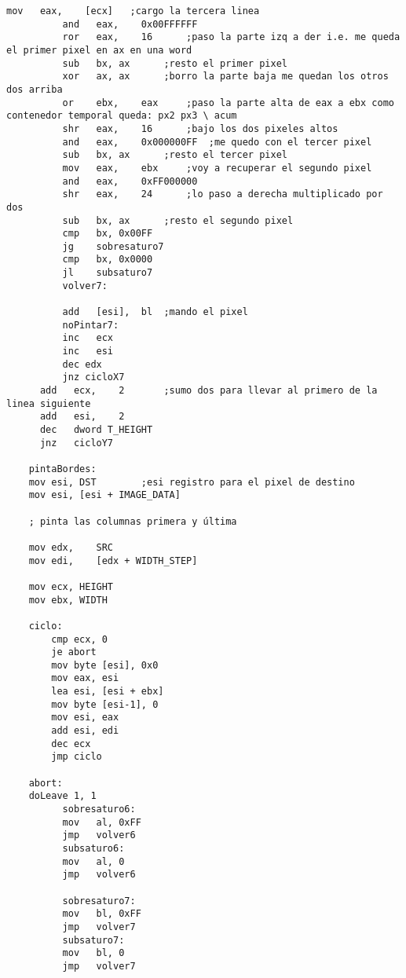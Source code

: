 \documentclass[11pt]{article}
\begin{document}
\begin{lstlisting}[frame=single]
	      mov	eax,	[ecx]	;cargo la tercera linea
	      and	eax,	0x00FFFFFF
	      ror	eax,	16		;paso la parte izq a der i.e. me queda el primer pixel en ax en una word
	      sub	bx,	ax		;resto el primer pixel
	      xor	ax,	ax		;borro la parte baja me quedan los otros dos arriba
	      or	ebx,	eax		;paso la parte alta de eax a ebx como contenedor temporal queda: px2 px3 \ acum
	      shr	eax,	16		;bajo los dos pixeles altos
	      and	eax,	0x000000FF	;me quedo con el tercer pixel
	      sub	bx,	ax		;resto el tercer pixel
	      mov	eax,	ebx		;voy a recuperar el segundo pixel
	      and	eax,	0xFF000000
	      shr	eax,	24		;lo paso a derecha multiplicado por dos
	      sub	bx,	ax		;resto el segundo pixel
	      cmp	bx,	0x00FF
	      jg	sobresaturo7
	      cmp	bx,	0x0000
	      jl	subsaturo7
	      volver7:

	      add	[esi],	bl	;mando el pixel
	      noPintar7:
	      inc	ecx
	      inc	esi
	      dec edx
	      jnz cicloX7
	  add	ecx,	2		;sumo dos para llevar al primero de la linea siguiente
	  add	esi,	2
	  dec	dword T_HEIGHT
	  jnz	cicloY7
	  
	pintaBordes:
	mov esi, DST		;esi registro para el pixel de destino
	mov esi, [esi + IMAGE_DATA]

	; pinta las columnas primera y última

	mov	edx,	SRC
	mov	edi,	[edx + WIDTH_STEP]

	mov ecx, HEIGHT
	mov ebx, WIDTH
	
	ciclo:
		cmp ecx, 0
		je abort
		mov byte [esi], 0x0
		mov eax, esi
		lea esi, [esi + ebx]
		mov byte [esi-1], 0
		mov esi, eax
		add esi, edi
		dec ecx
		jmp ciclo

	abort:
	doLeave 1, 1
	      sobresaturo6:
	      mov	al,	0xFF
	      jmp	volver6
	      subsaturo6:
	      mov	al,	0
	      jmp	volver6

	      sobresaturo7:
	      mov	bl,	0xFF
	      jmp	volver7
	      subsaturo7:
	      mov	bl,	0
	      jmp	volver7
\end{lstlisting}
\end{document}
